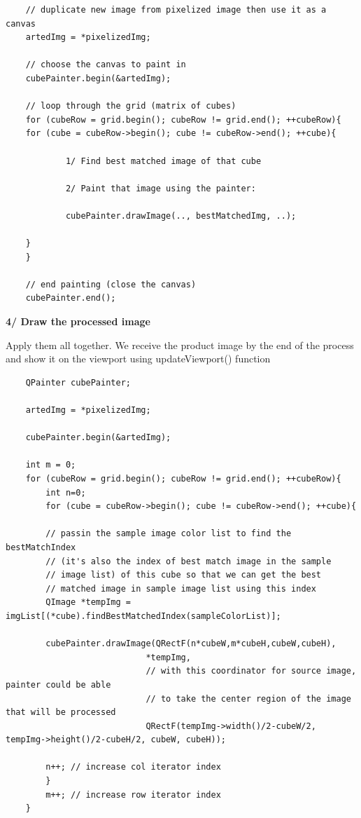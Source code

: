 \documentclass[english]{article}
\begin{document}
{\begin{lstlisting}
	// duplicate new image from pixelized image then use it as a canvas
	artedImg = *pixelizedImg;
	
	// choose the canvas to paint in
	cubePainter.begin(&artedImg);

	// loop through the grid (matrix of cubes)
	for (cubeRow = grid.begin(); cubeRow != grid.end(); ++cubeRow){
	for (cube = cubeRow->begin(); cube != cubeRow->end(); ++cube){
			
			1/ Find best matched image of that cube
			
			2/ Paint that image using the painter:
			
			cubePainter.drawImage(.., bestMatchedImg, ..);

	}
	}
	
	// end painting (close the canvas)
	cubePainter.end();

\end{lstlisting}



\textbf{4/ Draw the processed image } \newline

Apply them all together. We receive the product image by the end of the process and show it on the viewport using updateViewport() function

\lstset{language=C++}
\begin{lstlisting}
	QPainter cubePainter;
	
	artedImg = *pixelizedImg;
	
	cubePainter.begin(&artedImg);
	
	int m = 0;
	for (cubeRow = grid.begin(); cubeRow != grid.end(); ++cubeRow){
		int n=0;
		for (cube = cubeRow->begin(); cube != cubeRow->end(); ++cube){
		
		// passin the sample image color list to find the bestMatchIndex
		// (it's also the index of best match image in the sample
		// image list) of this cube so that we can get the best
		// matched image in sample image list using this index
		QImage *tempImg = imgList[(*cube).findBestMatchedIndex(sampleColorList)];
		
		cubePainter.drawImage(QRectF(n*cubeW,m*cubeH,cubeW,cubeH),
							*tempImg,
							// with this coordinator for source image, painter could be able
							// to take the center region of the image that will be processed
							QRectF(tempImg->width()/2-cubeW/2, tempImg->height()/2-cubeH/2, cubeW, cubeH));
		
		n++; // increase col iterator index	
		}
		m++; // increase row iterator index
	}
	

\end{lstlisting}}
\end{document}
